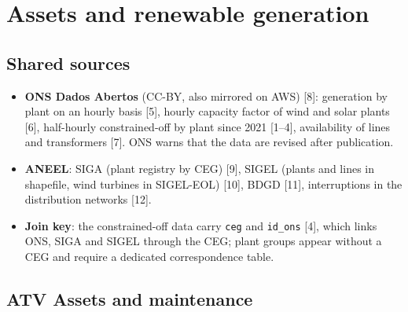 
\section{Assets and renewable generation}

\subsection*{Shared sources}
\begin{itemize}
  \item \textbf{ONS Dados Abertos} (CC-BY, also mirrored on AWS) [8]: generation
    by plant on an hourly basis [5], hourly capacity factor of wind and
    solar plants [6], half-hourly constrained-off by plant since 2021 [1--4],
    availability of lines and transformers [7]. ONS warns that the data
    are revised after publication.
  \item \textbf{ANEEL}: SIGA (plant registry by CEG) [9], SIGEL (plants and
    lines in shapefile, wind turbines in SIGEL-EOL) [10], BDGD [11],
    interruptions in the distribution networks [12].
  \item \textbf{Join key}: the constrained-off data carry \texttt{ceg} and
    \texttt{id\_ons} [4], which links ONS, SIGA and SIGEL through the CEG; plant
    groups appear without a CEG and require a dedicated correspondence table.
\end{itemize}

\subsection{ATV \textperiodcentered{} Assets and maintenance}

